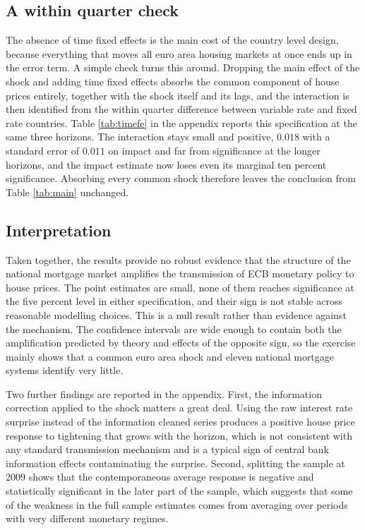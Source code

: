 \subsection{A within quarter check}
\label{sec:timefe}

The absence of time fixed effects is the main cost of the country level
design, because everything that moves all euro area housing markets at
once ends up in the error term. A simple check turns this around.
Dropping the main effect of the shock and adding time fixed effects
absorbs the common component of house prices entirely, together with the
shock itself and its lags, and the interaction is then identified from
the within quarter difference between variable rate and fixed rate
countries. Table \ref{tab:timefe} in the appendix reports this
specification at the same three horizons. The interaction stays small and
positive, $0.018$ with a standard error of $0.011$ on impact and far from
significance at the longer horizons, and the impact estimate now loses
even its marginal ten percent significance. Absorbing every common shock
therefore leaves the conclusion from Table \ref{tab:main} unchanged.

\subsection{Interpretation}

Taken together, the results provide no robust evidence that the structure of the
national mortgage market amplifies the transmission of ECB monetary policy to
house prices. The point estimates are small, none of them reaches significance
at the five percent level in either specification, and their sign is not
stable across reasonable modelling choices. This is a null result rather than
evidence against the mechanism. The confidence intervals are wide enough to
contain both the amplification predicted by theory and effects of the opposite
sign, so the exercise mainly shows that a common euro area shock and eleven
national mortgage systems identify very little.

Two further findings are reported in the appendix. First, the information
correction applied to the shock matters a great deal. Using the raw interest
rate surprise instead of the information cleaned series produces a positive
house price response to tightening that grows with the horizon, which is not
consistent with any standard transmission mechanism and is a typical sign
of central bank information effects contaminating the surprise. Second, splitting
the sample at 2009 shows that the contemporaneous average response is negative
and statistically significant in the later part of the sample, which suggests
that some of the weakness in the full sample estimates comes from averaging over
periods with very different monetary regimes.
